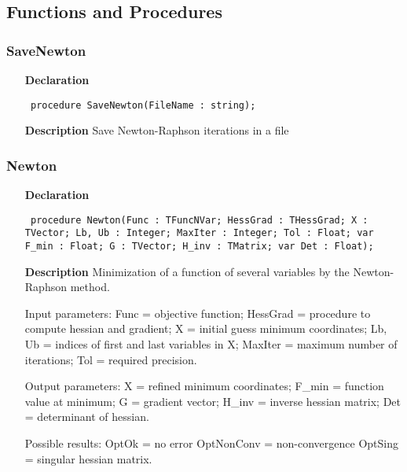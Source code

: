 \documentclass[12pt,a4paper,oneside]{report}
\newcommand{\declarationitem}[1]{\textbf{#1}}
\newcommand{\descriptiontitle}[1]{\textbf{#1}}
\newcommand{\code}[1]{\texttt{#1}}
\begin{document}
\subsection{Functions and Procedures}
\subsubsection{SaveNewton}
\label{unewton-SaveNewton}
\begin{itemize}\item[\declarationitem{Declaration}\hfill]
	\begin{flushleft}
		\code{
			procedure SaveNewton(FileName : string);}
		
	\end{flushleft}
	
	\par
	\item[\descriptiontitle{Description}]
	Save Newton{-}Raphson iterations in a file
	
\end{itemize}
\subsubsection{Newton}
\label{unewton-Newton}
\begin{itemize}\item[\declarationitem{Declaration}\hfill]
	\begin{flushleft}
		\code{
			procedure Newton(Func : TFuncNVar; HessGrad : THessGrad; X : TVector; Lb, Ub : Integer; MaxIter : Integer; Tol : Float; var F{\_}min : Float; G : TVector; H{\_}inv : TMatrix; var Det : Float);}
		
	\end{flushleft}
	
	\par
	\item[\descriptiontitle{Description}]
	Minimization of a function of several variables by the Newton{-}Raphson method.
	
	Input parameters: Func = objective function; HessGrad = procedure to compute hessian and gradient; X = initial guess minimum coordinates; Lb, Ub = indices of first and last variables in X; MaxIter = maximum number of iterations; Tol = required precision.
	
	Output parameters: X = refined minimum coordinates; F{\_}min = function value at minimum; G = gradient vector; H{\_}inv = inverse hessian matrix; Det = determinant of hessian.
	
	Possible results: OptOk = no error OptNonConv = non{-}convergence OptSing = singular hessian matrix.
	
\end{itemize}
\end{document}
